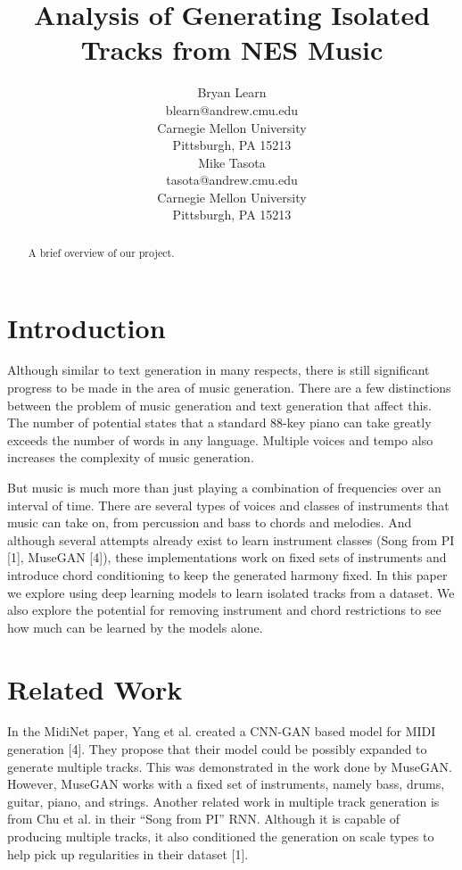 \documentclass{article}
\title{Analysis of Generating Isolated Tracks from NES Music}
\author{
  Bryan Learn\\
  blearn@andrew.cmu.edu\\
  Carnegie Mellon University\\
  Pittsburgh, PA 15213\\
  \And
  Mike Tasota\\
  tasota@andrew.cmu.edu\\
  Carnegie Mellon University\\
  Pittsburgh, PA 15213\\
}
\begin{document}

\maketitle


\begin{abstract}
  A brief overview of our project.
\end{abstract}


\section{Introduction}


Although similar to text generation in many respects, there is still significant progress to be made in the area of music generation. There are a few distinctions between the problem of music generation and text generation that affect this. The number of potential states that a standard 88-key piano can take greatly exceeds the number of words in any language. 
Multiple voices and tempo also increases the complexity of music generation.

But music is much more than just playing a combination of frequencies over an interval of time. There are several types of voices and classes of instruments that music can take on, from percussion and bass to chords and melodies. And although several attempts already exist to learn instrument classes (Song from PI [1], MuseGAN [4]), these implementations work on fixed sets of instruments and introduce chord conditioning to keep the generated harmony fixed. In this paper we explore using deep learning models to learn isolated tracks from a dataset. We also explore the potential for removing instrument and chord restrictions to see how much can be learned by the models alone.


\section{Related Work}


In the MidiNet paper, Yang et al. created a CNN-GAN based model for MIDI generation [4]. They propose that their model could be possibly expanded to generate multiple tracks. This was demonstrated in the work done by MuseGAN. However, MuseGAN works with a fixed set of instruments, namely bass, drums, guitar, piano, and strings. Another related work in multiple track generation is from Chu et al. in their “Song from PI” RNN. Although it is capable of producing multiple tracks, it also conditioned the generation on scale types to help pick up regularities in their dataset [1].
\end{document}
